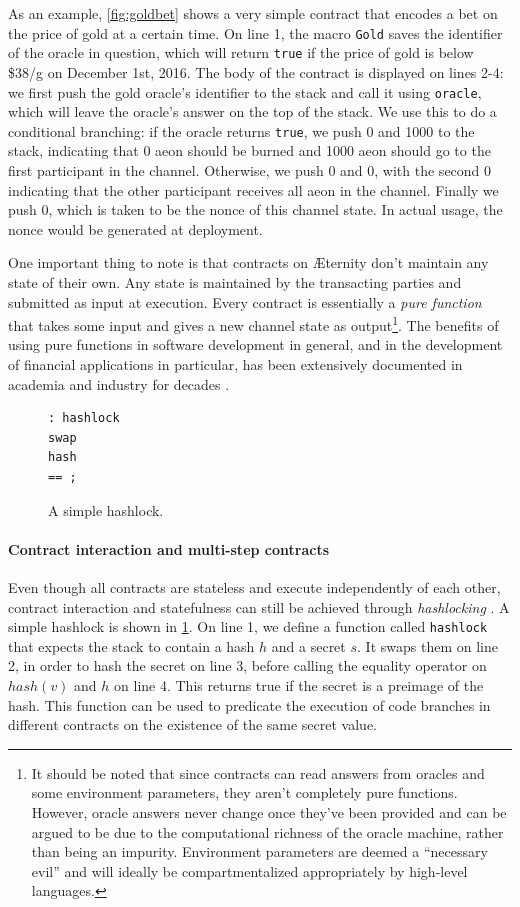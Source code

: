 \documentclass[a4paper, 10pt, conference]{ieeeconf}      %
\begin{document}
\begin{draft}
As an example, \cref{fig:goldbet} shows a very simple contract that encodes a bet on the price of gold at a certain time. On line 1, the macro \texttt{Gold} saves the identifier of the oracle in question, which will return \texttt{true} if the price of gold is below \$38/g on December 1st, 2016. The body of the contract is displayed on lines 2-4: we first push the gold oracle's identifier to the stack and call it using \texttt{oracle}, which will leave the oracle's answer on the top of the stack. We use this to do a conditional branching: if the oracle returns \texttt{true}, we push 0 and 1000 to the stack, indicating that 0 aeon should be burned and 1000 aeon should go to the first participant in the channel. Otherwise, we push 0 and 0, with the second 0 indicating that the other participant receives all aeon in the channel. Finally we push 0, which is taken to be the nonce of this channel state. In actual usage, the nonce would be generated at deployment. 

One important thing to note is that contracts on Æternity don't maintain any state of their own. Any state is maintained by the transacting parties and submitted as input at execution. Every contract is essentially a \emph{pure function} that takes some input and gives a new channel state as output\footnote{It should be noted that since contracts can read answers from oracles and some environment parameters, they aren't completely pure functions. However, oracle answers never change once they've been provided and can be argued to be due to the computational richness of the oracle machine, rather than being an impurity. Environment parameters are deemed a ``necessary evil'' and will ideally be compartmentalized appropriately by high-level languages.}. The benefits of using pure functions in software development in general, and in the development of financial applications in particular, has been extensively documented in academia and industry for decades \cite{formal_contracts}\source.

\begin{figure}
\begin{lstlisting}
: hashlock
swap
hash
== ;
\end{lstlisting}
\caption{A simple hashlock.}
\label{fig:hashlock}
\end{figure}

\paragraph{Contract interaction and multi-step contracts}
\label{sec:hashlock}
Even though all contracts are stateless and execute independently of each other, contract interaction and statefulness can still be achieved through \emph{hashlocking} \source. A simple hashlock is shown in \cref{fig:hashlock}. On line 1, we define a function called \texttt{hashlock} that expects the stack to contain a hash $h$ and a secret $s$. It swaps them on line 2, in order to hash the secret on line 3, before calling the equality operator on $hash(v)$ and $h$ on line 4. This returns true if the secret is a preimage of the hash. This function can be used to predicate the execution of code branches in different contracts on the existence of the same secret value.


\end{draft}
\end{document}
